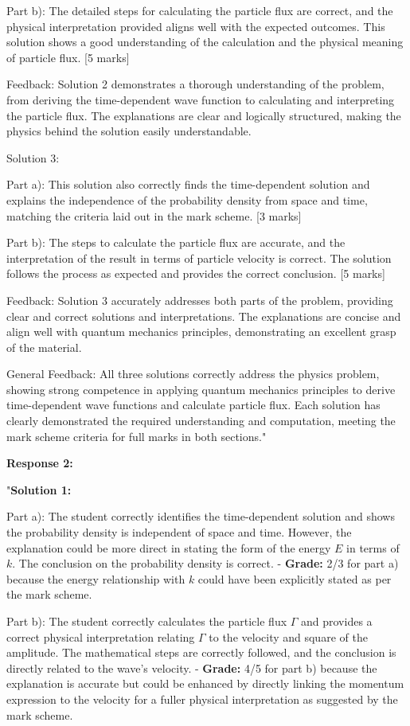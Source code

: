 \documentclass[a4paper,11pt]{article}
\begin{document}
Part b): The detailed steps for calculating the particle flux are correct, and the physical interpretation provided aligns well with the expected outcomes. This solution shows a good understanding of the calculation and the physical meaning of particle flux. [5 marks]

Feedback: Solution 2 demonstrates a thorough understanding of the problem, from deriving the time-dependent wave function to calculating and interpreting the particle flux. The explanations are clear and logically structured, making the physics behind the solution easily understandable.

Solution 3:

Part a): This solution also correctly finds the time-dependent solution and explains the independence of the probability density from space and time, matching the criteria laid out in the mark scheme. [3 marks]

Part b): The steps to calculate the particle flux are accurate, and the interpretation of the result in terms of particle velocity is correct. The solution follows the process as expected and provides the correct conclusion. [5 marks]

Feedback: Solution 3 accurately addresses both parts of the problem, providing clear and correct solutions and interpretations. The explanations are concise and align well with quantum mechanics principles, demonstrating an excellent grasp of the material.

General Feedback: All three solutions correctly address the physics problem, showing strong competence in applying quantum mechanics principles to derive time-dependent wave functions and calculate particle flux. Each solution has clearly demonstrated the required understanding and computation, meeting the mark scheme criteria for full marks in both sections."

\textbf{Response 2:}

"\textbf{Solution 1:}

Part a): The student correctly identifies the time-dependent solution and shows the probability density is independent of space and time. However, the explanation could be more direct in stating the form of the energy $E$ in terms of $k$. The conclusion on the probability density is correct.
- \textbf{Grade:} 2/3 for part a) because the energy relationship with $k$ could have been explicitly stated as per the mark scheme.

Part b): The student correctly calculates the particle flux $\Gamma$ and provides a correct physical interpretation relating $\Gamma$ to the velocity and square of the amplitude. The mathematical steps are correctly followed, and the conclusion is directly related to the wave's velocity.
- \textbf{Grade:} 4/5 for part b) because the explanation is accurate but could be enhanced by directly linking the momentum expression to the velocity for a fuller physical interpretation as suggested by the mark scheme.
\end{document}
